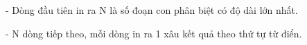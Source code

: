 - Dòng đầu tiên in ra N là số đoạn con phân biệt có độ dài lớn nhất.  

   - N dòng tiếp theo, mỗi dòng in ra 1 xâu kết quả theo thứ tự từ điển.